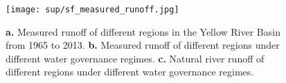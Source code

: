 \begin{figure}[!ht]
	\centering
	\texttt{[image: sup/sf\_measured\_runoff.jpg]}
	\caption{
		\textbf{a.} Measured runoff of different regions in the Yellow River Basin from 1965 to 2013.
		\textbf{b.} Measured runoff of different regions under different water governance regimes.
		\textbf{c.} Natural river runoff of different regions under different water governance regimes.
	}\label{fig:runoff}
\end{figure}

